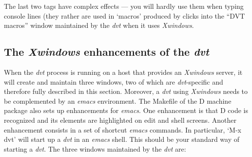 The last two tags have complex effects --- you will hardly use them when typing console lines (they rather are used in `macros' produced by clicks into the ``DVT macros'' window maintained by the \emph{dvt} when it uses \emph{Xwindows}.

\subsection{The \emph{Xwindows} enhancements of the \emph{dvt}}

When the \emph{dvt} process is running on a host that provides an \emph{Xwindows} server, it will create and maintain three windows, two of which are \emph{dvt}-specific and therefore fully described in this section. Moreover, a \emph{dvt} using \emph{Xwindows} needs to be complemented by an \emph{emacs} environment. The Makefile of the D machine package also sets up enhancements for \emph{emacs}. One enhancement is that D code is recognized and its elements are highlighted on edit and shell screens. Another enhancement consists in a set of shortcut \emph{emacs} commands. In particular, `M-x dvt' will start up a \emph{dvt} in an \emph{emacs} shell. This should be your standard way of starting a \emph{dvt}. The three windows maintained by the \emph{dvt} are:

